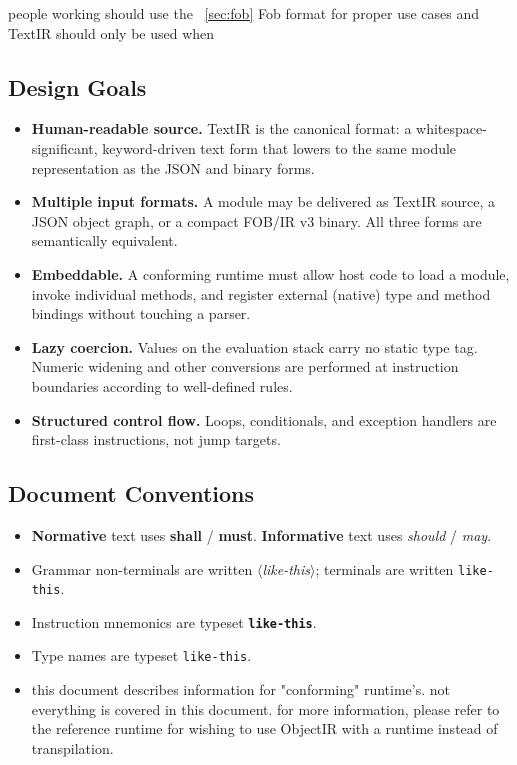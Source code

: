 \documentclass[11pt,a4paper]{article}
\newcommand{\typename}[1]{\textcolor{typecolor}{\texttt{\small #1}}}
\newcommand{\opcode}[1]{\textbf{\texttt{#1}}}
\newcommand{\nterm}[1]{\textit{$\langle$#1$\rangle$}}
\newcommand{\term}[1]{\texttt{#1}}
\begin{document}
\begin{notebox}
people working should use the ~\ref{sec:fob} Fob format for proper use cases and TextIR should only be used when 
\end{notebox}
\subsection{Design Goals}

\begin{itemize}[leftmargin=1.8em]
  \item \textbf{Human-readable source.} TextIR is the canonical format: a
    whitespace-significant, keyword-driven text form that lowers to the same
    module representation as the JSON and binary forms.
  \item \textbf{Multiple input formats.} A module may be delivered as TextIR
    source, a JSON object graph, or a compact FOB/IR v3 binary. All three
    forms are semantically equivalent.
  \item \textbf{Embeddable.} A conforming runtime must allow host code to
    load a module, invoke individual methods, and register external (native)
    type and method bindings without touching a parser.
  \item \textbf{Lazy coercion.} Values on the evaluation stack carry no
    static type tag. Numeric widening and other conversions are performed
    at instruction boundaries according to well-defined rules.
  \item \textbf{Structured control flow.} Loops, conditionals, and exception
    handlers are first-class instructions, not jump targets.
\end{itemize}

\subsection{Document Conventions}

\begin{itemize}[leftmargin=1.8em]
  \item \textbf{Normative} text uses \textbf{shall} / \textbf{must}.
    \textbf{Informative} text uses \textit{should} / \textit{may}.
  \item Grammar non-terminals are written \nterm{like-this}; terminals are
    written \term{like-this}.
  \item Instruction mnemonics are typeset \opcode{like-this}.
  \item Type names are typeset \typename{like-this}.
  \item this document describes information for "conforming" runtime's.
  not everything is covered in this document. for more information, please refer to the reference runtime for wishing to use ObjectIR with a runtime instead of transpilation.
\end{itemize}
\end{document}
